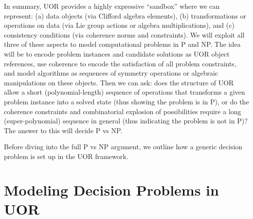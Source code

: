\documentclass[11pt]{article}
\begin{document}
In summary, UOR provides a highly expressive “sandbox” where we can represent: (a) data objects (via Clifford algebra elements), (b) transformations or operations on data (via Lie group actions or algebra multiplications), and (c) consistency conditions (via coherence norms and constraints). We will exploit all three of these aspects to model computational problems in P and NP. The idea will be to encode problem instances and candidate solutions as UOR object references, use coherence to encode the satisfaction of all problem constraints, and model algorithms as sequences of symmetry operations or algebraic manipulations on these objects. Then we can ask: does the structure of UOR allow a short (polynomial-length) sequence of operations that transforms a given problem instance into a solved state (thus showing the problem is in P), or do the coherence constraints and combinatorial explosion of possibilities require a long (super-polynomial) sequence in general (thus indicating the problem is not in P)? The answer to this will decide P vs NP.

Before diving into the full P vs NP argument, we outline how a generic decision problem is set up in the UOR framework.

\section{Modeling Decision Problems in UOR}
\end{document}
